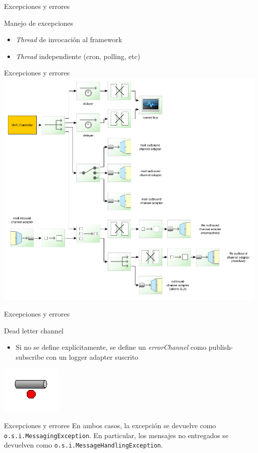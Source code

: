 \documentclass{beamer}
\begin{document}
\begin{frame}{Excepciones y errores}
\begin{center}
{\large Manejo de excepciones}
\end{center}
\begin{itemize}
\item \textit{Thread} de invocación al framework
\item \textit{Thread} independiente (cron, polling, etc)
\end{itemize}
\end{frame}

\begin{frame}{Excepciones y errores}
\includegraphics[width=0.7\linewidth]{sp-int-99}
\end{frame}

\begin{frame}{Excepciones y errores}
\par
{\large Dead letter channel}
\begin{itemize}
\item Si no se define explícitamente, se define un \textit{errorChannel} como publish-subscribe con un logger adapter suscrito
\end{itemize}
\begin{center}
\includegraphics[width=0.2\linewidth]{sp-int-21}
\end{center}
\end{frame}

\begin{frame}[fragile]{Excepciones y errores}
En ambos casos, la excepción se devuelve como \verb|o.s.i.MessagingException|. En particular, los mensajes no entregados se devuelven como \verb|o.s.i.MessageHandlingException|.
\end{frame}
\end{document}
